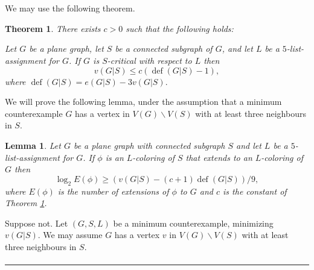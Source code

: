 \documentclass[letterpaper,12pt,oneside,onecolumn]{article}
\newenvironment{proof}{{\bf Proof:  }}{\hfill\rule{2mm}{2mm}}
\newtheorem{lemma}[fact]{Lemma}
\newtheorem{theorem}[fact]{Theorem}
\DeclareMathOperator{\defi}{def}
\begin{document}
\section{}
We may use the following theorem.
\begin{theorem}\label{th:def}
	There exists $c>0$ such that the following holds:
	
	Let $G$ be a plane graph, let $S$ be a connected subgraph of $G$, and let $L$ be a $5$-list-assignment for $G$. If $G$ is $S$-critical with respect to $L$ then
	$$v(G|S) \leq c(\defi(G|S) - 1),$$
	where $\defi(G|S) = e(G|S) - 3v(G|S).$
\end{theorem}
We will prove the following lemma, under the assumption that a minimum counterexample $G$ has a vertex in $V(G)\backslash V(S)$ with at least three neighbours in $S$.
\begin{lemma}
	Let $G$ be a plane graph with connected subgraph $S$ and let $L$ be a $5$-list-assignment for $G$. If $\phi$ is an $L$-coloring of $S$ that extends to an $L$-coloring of $G$ then
	$$\log_2 E(\phi) \geq (v(G|S) - (c+1)\defi(G|S))/9,$$
	where $E(\phi)$ is the number of extensions of $\phi$ to $G$ and $c$ is the constant of Theorem \ref{th:def}.
\end{lemma}
\begin{proof}
	Suppose not. Let $(G,S,L)$ be a minimum counterexample, minimizing $v(G|S)$. We may assume $G$ has a vertex $v$ in $V(G)\backslash V(S)$ with at least three neighbours in $S$.
	\paragraph{}
	 
\end{proof}

\section{}
\end{document}
